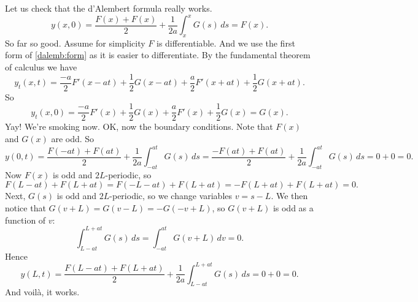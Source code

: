 Let us check that the d'Alembert formula really works.
\begin{equation*}
y(x,0) =
\frac{F(x) + F(x)}{2} + \frac{1}{2a} \int_{x}^{x} G(s) \,ds 
=
F(x) .
\end{equation*}
So far so good.  Assume for simplicity $F$ is differentiable.
And we use the first form of \eqref{dalemb:form} as it is
easier to differentiate.
By the fundamental theorem of calculus we have
\begin{equation*}
y_t(x,t) =
\frac{-a}{2} F'(x-at) + \frac{1}{2} G(x-at)
+
\frac{a}{2} F'(x+at) + \frac{1}{2} G(x+at) .
\end{equation*}
So
\begin{equation*}
y_t(x,0) =
\frac{-a}{2} F'(x) + \frac{1}{2} G(x)
+
\frac{a}{2} F'(x) + \frac{1}{2} G(x) = G(x) .
\end{equation*}
Yay!  We're smoking now.  OK\@, now the boundary conditions.  Note
that $F(x)$ and $G(x)$ are odd.  So
\begin{equation*}
y(0,t) =
\frac{F(-at) + F(at)}{2} + \frac{1}{2a} \int_{-at}^{at} G(s) \,ds 
=
\frac{-F(at) + F(at)}{2} + \frac{1}{2a} \int_{-at}^{at} G(s) \,ds 
= 0 + 0 = 0.
\end{equation*}
Now $F(x)$ is odd and $2L$-periodic, so
\begin{equation*}
F(L-at)+F(L+at)
= 
F(-L-at)+F(L+at)
=
-F(L+at)+F(L+at)
= 0 .
\end{equation*}
Next, $G(s)$ is odd and $2L$-periodic, so we change
variables $v = s-L$.  We then notice that $G(v+L)=G(v-L)=-G(-v+L)$,
so $G(v+L)$ is odd as a function of $v$:
\begin{equation*}
\int_{L-at}^{L+at}
G(s)\,ds
=
\int_{-at}^{at}
G(v+L)\,dv
=
0 .
\end{equation*}
Hence
\begin{equation*}
y(L,t) =
\frac{F(L-at) + F(L+at)}{2} + \frac{1}{2a} \int_{L-at}^{L+at} G(s) \,ds 
=
0 + 0  = 0.
\end{equation*}
And voil\`a, it works.

